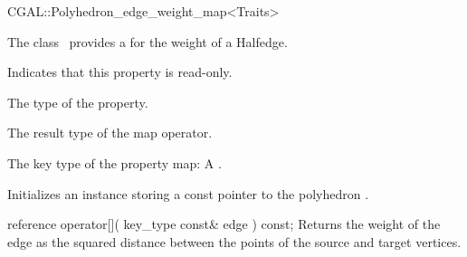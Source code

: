 

\begin{ccRefClass}{CGAL::Polyhedron_edge_weight_map<Traits>}


\ccDefinition

The class \ccRefName\ provides a   for the weight of a  Halfedge. 


\ccTypes
    {Indicates that this property is read-only.}
  
    {The type of the property.}
    
    {The result type of the map operator.}
    
  {The key type of the property map: A .}

\ccCreation
{}  %

{Initializes an instance storing a const pointer to the polyhedron .}

\ccOperations

\ccMethod
  {reference operator[]( key_type const& edge ) const;}
  {Returns the weight of the edge as the squared distance between the points of the source and target vertices.}  
    
\ccIsModel
{}

\end{ccRefClass}



